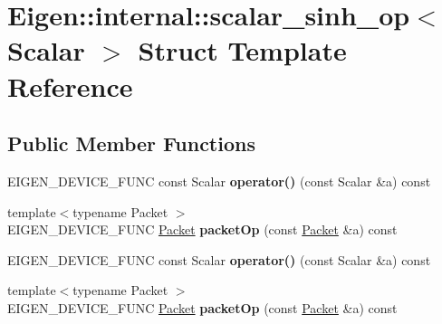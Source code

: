 \hypertarget{struct_eigen_1_1internal_1_1scalar__sinh__op}{}\section{Eigen\+:\+:internal\+:\+:scalar\+\_\+sinh\+\_\+op$<$ Scalar $>$ Struct Template Reference}
\label{struct_eigen_1_1internal_1_1scalar__sinh__op}
\subsection*{Public Member Functions}
\begin{DoxyCompactItemize}
\item 
\mbox{\label{struct_eigen_1_1internal_1_1scalar__sinh__op_a05557c1347e1334158d2950d0bd3f058}} 
E\+I\+G\+E\+N\+\_\+\+D\+E\+V\+I\+C\+E\+\_\+\+F\+U\+NC const Scalar {\bfseries operator()} (const Scalar \&a) const
\item 
\mbox{\label{struct_eigen_1_1internal_1_1scalar__sinh__op_a1863cdd74bb1c43cd794dc3bc5980610}} 
{\footnotesize template$<$typename Packet $>$ }\\E\+I\+G\+E\+N\+\_\+\+D\+E\+V\+I\+C\+E\+\_\+\+F\+U\+NC \hyperlink{union_eigen_1_1internal_1_1_packet}{Packet} {\bfseries packet\+Op} (const \hyperlink{union_eigen_1_1internal_1_1_packet}{Packet} \&a) const
\item 
\mbox{\label{struct_eigen_1_1internal_1_1scalar__sinh__op_a05557c1347e1334158d2950d0bd3f058}} 
E\+I\+G\+E\+N\+\_\+\+D\+E\+V\+I\+C\+E\+\_\+\+F\+U\+NC const Scalar {\bfseries operator()} (const Scalar \&a) const
\item 
\mbox{\label{struct_eigen_1_1internal_1_1scalar__sinh__op_a1863cdd74bb1c43cd794dc3bc5980610}} 
{\footnotesize template$<$typename Packet $>$ }\\E\+I\+G\+E\+N\+\_\+\+D\+E\+V\+I\+C\+E\+\_\+\+F\+U\+NC \hyperlink{union_eigen_1_1internal_1_1_packet}{Packet} {\bfseries packet\+Op} (const \hyperlink{union_eigen_1_1internal_1_1_packet}{Packet} \&a) const
\end{DoxyCompactItemize}


